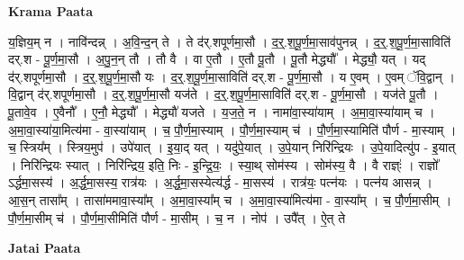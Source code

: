 \documentclass[17pt]{extarticle}
\begin{document}
\textbf{Krama Paata} \newline

य॒ज्ञिय॒म् न । नावि॑न्दन्न् । अ॒वि॒न्द॒न् ते । ते द॑र्.शपूर्णमा॒सौ । द॒र्॒.श॒पू॒र्ण॒मा॒साव॑पुनन्न् । द॒र्॒.श॒पू॒र्ण॒मा॒साविति॑ दर्.श - पू॒र्ण॒मा॒सौ । अ॒पु॒न॒न् तौ । तौ वै । वा ए॒तौ । ए॒तौ पू॒तौ । पू॒तौ मेद्ध्यौ᳚ । मेद्ध्यौ॒ यत् । यद् द॑र्.शपूर्णमा॒सौ । द॒र्॒.श॒पू॒र्ण॒मा॒सौ यः । द॒र्॒.श॒पू॒र्ण॒मा॒साविति॑ दर्.श - पू॒र्ण॒मा॒सौ । य ए॒वम् । ए॒वम् ॅवि॒द्वान् । वि॒द्वान् द॑र्.शपूर्णमा॒सौ । द॒र्॒.श॒पू॒र्ण॒मा॒सौ यज॑ते । द॒र्॒.श॒पू॒र्ण॒मा॒साविति॑ दर्.श - पू॒र्ण॒मा॒सौ । यज॑ते पू॒तौ । पू॒तावे॒व । ए॒वैनौ᳚ । ए॒नौ॒ मेद्ध्यौ᳚ । मेद्ध्यौ॑ यजते । य॒ज॒ते॒ न । नामा॑वा॒स्या॑याम् । अ॒मा॒वा॒स्या॑याम् च । अ॒मा॒वा॒स्या॑या॒मित्य॑मा - वा॒स्या॑याम् । च॒ पौ॒र्ण॒मा॒स्याम् । पौ॒र्ण॒मा॒स्याम् च॑ । पौ॒र्ण॒मा॒स्यामिति॑ पौर्ण - मा॒स्याम् । च॒ स्त्रिय᳚म् । स्त्रिय॒मुप॑ । उपे॑यात् । इ॒या॒द् यत् । यदु॑पे॒यात् । उ॒पे॒यान् निरि॑न्द्रियः । उ॒पे॒यादित्यु॑प - इ॒यात् । निरि॑न्द्रियः स्यात् । निरि॑न्द्रिय॒ इति॒ निः - इ॒न्द्रि॒यः॒ । स्या॒थ् सोम॑स्य । सोम॑स्य॒ वै । वै राज्ञ्ः॑ । राज्ञो᳚ ऽर्द्धमा॒सस्य॑ । अ॒र्द्ध॒मा॒सस्य॒ रात्र॑यः । अ॒र्द्ध॒मा॒सस्येत्य॑र्द्ध - मा॒सस्य॑ । रात्र॑यः॒ पत्न॑यः । पत्न॑य आसन्न् । आ॒स॒न् तासा᳚म् । तासा॑ममावा॒स्या᳚म् । अ॒मा॒वा॒स्या᳚म् च । अ॒मा॒वा॒स्या॑मित्य॑मा - वा॒स्या᳚म् । च॒ पौ॒र्ण॒मा॒सीम् । पौ॒र्ण॒मा॒सीम् च॑ । पौ॒र्ण॒मा॒सीमिति॑ पौर्ण - मा॒सीम् । च॒ न । नोप॑ । उपै᳚त् । ऐ॒त् ते \newline

\textbf{Jatai Paata} \newline
\end{document}
